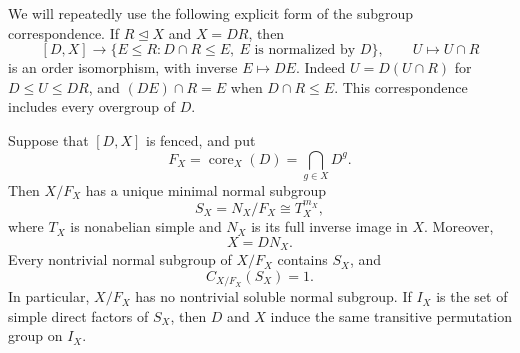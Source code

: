 We will repeatedly use the following explicit form of the subgroup
correspondence. If $R\trianglelefteq X$ and $X=DR$, then
\begin{equation}
 \label{frm:supplement-correspondence}
 [D,X]\longrightarrow
 \{E\le R:D\cap R\le E,\ E\text{ is normalized by }D\},
 \qquad U\longmapsto U\cap R
\end{equation}
is an order isomorphism, with inverse $E\mapsto DE$. Indeed
$U=D(U\cap R)$ for $D\le U\le DR$, and $(DE)\cap R=E$ when
$D\cap R\le E$. This correspondence includes every overgroup of $D$.

\begin{lemma}[Labels]
\label{frm:labels}
Suppose that $[D,X]$ is fenced, and put
\[
 F_X=\operatorname{core}_X(D)
     =\bigcap_{g\in X}D^g.
\]
Then $X/F_X$ has a unique minimal normal subgroup
\begin{equation}
 \label{frm:socle-label}
 S_X=N_X/F_X\cong T_X^{m_X},
\end{equation}
where $T_X$ is nonabelian simple and $N_X$ is its full inverse image in
$X$. Moreover,
\[
 X=DN_X.
\]
Every nontrivial normal subgroup of $X/F_X$ contains $S_X$, and
\[
 C_{X/F_X}(S_X)=1.
\]
In particular, $X/F_X$ has no nontrivial soluble normal subgroup.
If $I_X$ is the set of simple direct factors of $S_X$, then $D$ and $X$
induce the same transitive permutation group on $I_X$.
\end{lemma}

